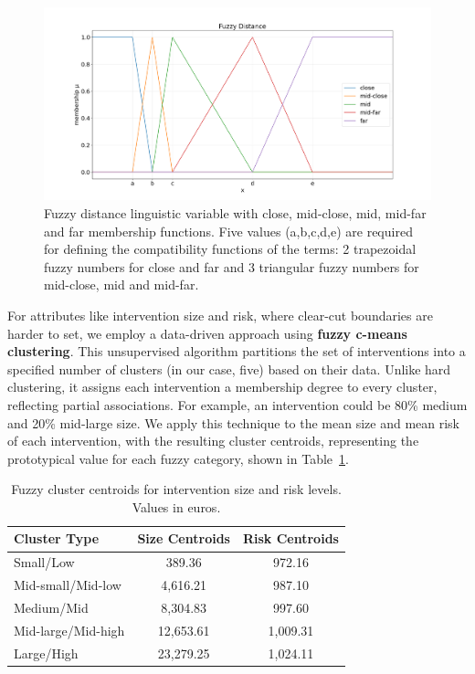 \begin{figure}[!ht]
    \centering
    \includegraphics[width=\linewidth]{ch3/figures/Fuzzy distance.png}
    \caption{Fuzzy distance linguistic variable with close, mid-close, mid, mid-far and far membership functions. Five values (a,b,c,d,e) are required for defining the compatibility functions of the terms: 2 trapezoidal fuzzy numbers for close and far and 3 triangular fuzzy numbers for mid-close, mid and mid-far.}
    \label{fig:fuzzy_distance}
    \end{figure}

For attributes like intervention size and risk, where clear-cut boundaries are harder to set, we employ a data-driven approach using \textbf{fuzzy c-means clustering}. This unsupervised algorithm partitions the set of interventions into a specified number of clusters (in our case, five) based on their data. Unlike hard clustering, it assigns each intervention a membership degree to every cluster, reflecting partial associations. For example, an intervention could be 80\% medium and 20\% mid-large size. We apply this technique to the mean size and mean risk of each intervention, with the resulting cluster centroids, representing the prototypical value for each fuzzy category, shown in Table~\ref{tab:fuzzy_centroids}.

\begin{table}[!ht]
    \centering
    \begin{tabular}{lcc}
    \hline
    \textbf{Cluster Type} & \textbf{Size Centroids} & \textbf{Risk Centroids} \\
    \hline
    Small/Low & 389.36 & 972.16 \\
    Mid-small/Mid-low & 4,616.21 & 987.10 \\
    Medium/Mid & 8,304.83 & 997.60 \\
    Mid-large/Mid-high & 12,653.61 & 1,009.31 \\
    Large/High & 23,279.25 & 1,024.11 \\
    \hline
    \end{tabular}
    \caption{Fuzzy cluster centroids for intervention size and risk levels. Values in euros.}
    \label{tab:fuzzy_centroids}
    \end{table}

